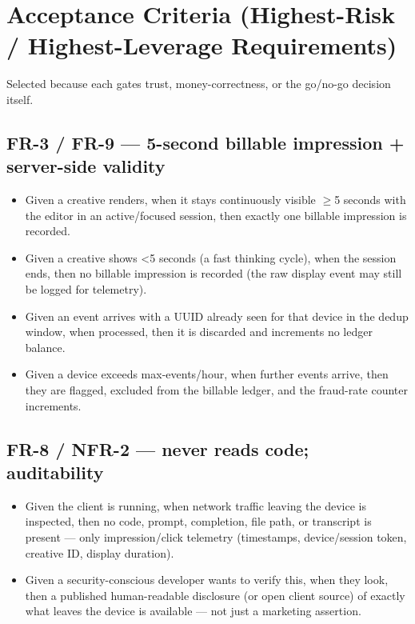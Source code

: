 \section{Acceptance Criteria (Highest-Risk / Highest-Leverage Requirements)}
\label{sec:acceptance-criteria}

Selected because each gates trust, money-correctness, or the go/no-go decision itself.

\subsection*{FR-3 / FR-9 --- 5-second billable impression + server-side validity}
\begin{itemize}
\item Given a creative renders, when it stays continuously visible $\geq$5 seconds with the editor in an active/focused session, then exactly one billable impression is recorded.
\item Given a creative shows \textless5 seconds (a fast thinking cycle), when the session ends, then no billable impression is recorded (the raw display event may still be logged for telemetry).
\item Given an event arrives with a UUID already seen for that device in the dedup window, when processed, then it is discarded and increments no ledger balance.
\item Given a device exceeds max-events/hour, when further events arrive, then they are flagged, excluded from the billable ledger, and the fraud-rate counter increments.
\end{itemize}

\subsection*{FR-8 / NFR-2 --- never reads code; auditability}
\begin{itemize}
\item Given the client is running, when network traffic leaving the device is inspected, then no code, prompt, completion, file path, or transcript is present --- only impression/click telemetry (timestamps, device/session token, creative ID, display duration).
\item Given a security-conscious developer wants to verify this, when they look, then a published human-readable disclosure (or open client source) of exactly what leaves the device is available --- not just a marketing assertion.
\end{itemize}

